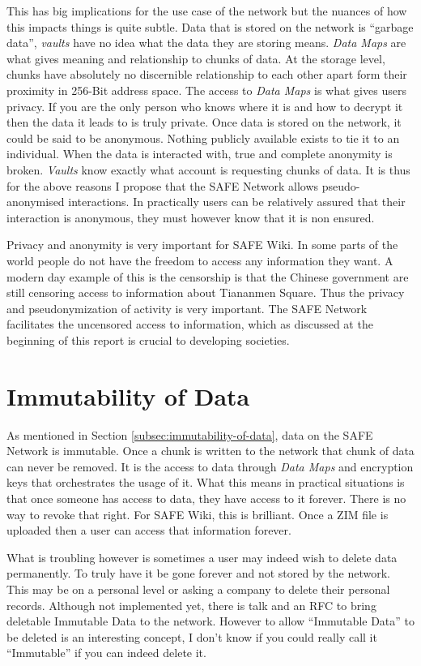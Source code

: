 This has big implications for the use case of the network but the nuances of how this impacts things is quite subtle. Data that is stored on the network is ``garbage data'', \textit{vaults} have no idea what the data they are storing means. \textit{Data Maps} are what gives meaning and relationship to chunks of data. At the storage level, chunks have absolutely no discernible relationship to each other apart form their proximity in 256-Bit address space. The access to \textit{Data Maps} is what gives users privacy. If you are the only person who knows where it is and how to decrypt it then the data it leads to is truly private. Once data is stored on the network, it could be said to be anonymous. Nothing publicly available exists to tie it to an individual. When the data is interacted with, true and complete anonymity is broken. \textit{Vaults} know exactly what account is requesting chunks of data. It is thus for the above reasons I propose that the SAFE Network allows pseudo-anonymised interactions. In practically users can be relatively assured that their interaction is anonymous, they must however know that it is non ensured.

Privacy and anonymity is very important for SAFE Wiki. In some parts of the world people do not have the freedom to access any information they want. A modern day example of this is the censorship is that the Chinese government are still censoring access to information about Tiananmen Square\cite{tiananmen-square}. Thus the privacy and pseudonymization of activity is very important. The SAFE Network facilitates the uncensored access to information, which as discussed at the beginning of this report is crucial to developing societies.

\section{Immutability of Data}

As mentioned in Section \ref{subsec:immutability-of-data}, data on the SAFE Network is immutable. Once a chunk is written to the network that chunk of data can never be removed. It is the access to data through \textit{Data Maps} and encryption keys that orchestrates the usage of it. What this means in practical situations is that once someone has access to data, they have access to it forever. There is no way to revoke that right. For SAFE Wiki, this is brilliant. Once a ZIM file is uploaded then a user can access that information forever.

What is troubling however is sometimes a user may indeed wish to delete data permanently. To truly have it be gone forever and not stored by the network. This may be on a personal level or asking a company to delete their personal records. Although not implemented yet, there is talk and an RFC\cite{delete-data-rfc} to bring deletable Immutable Data to the network. However to allow ``Immutable Data'' to be deleted is an interesting concept, I don't know if you could really call it ``Immutable'' if you can indeed delete it.

